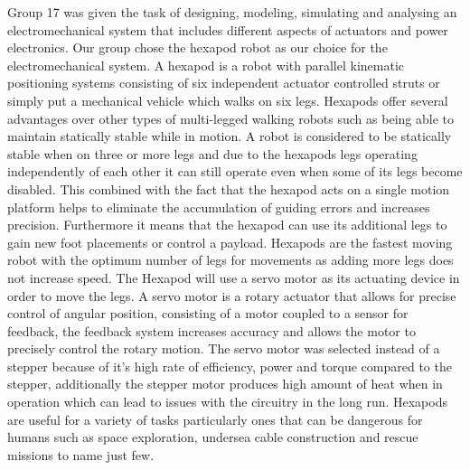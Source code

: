 
Group 17 was given the task of designing, modeling, simulating and analysing an electromechanical system that includes different aspects of actuators and power electronics. Our group chose the hexapod robot as our choice for the electromechanical system. A hexapod is a robot with parallel kinematic positioning systems consisting of six independent actuator controlled struts or simply put a mechanical vehicle which walks on six legs. Hexapods offer several advantages over other types of multi-legged  walking robots such as being able to maintain statically stable while in motion. A robot is considered to be statically stable when on three or more legs and due to the hexapods legs operating independently of each other it can still operate even when some of its legs become disabled. This combined with the fact that the hexapod acts on a single motion platform helps to eliminate the accumulation of guiding errors and increases precision. Furthermore it means that  the hexapod can use its additional legs to gain new foot placements or control a payload. Hexapods are the fastest moving robot with the optimum number of legs for movements as adding more legs does not increase speed. The Hexapod will use a servo motor as its actuating device in order to move the legs. A servo motor is a rotary actuator that allows for precise control of angular position, consisting of a motor coupled to a sensor for feedback, the feedback system increases accuracy and allows the motor to precisely control the rotary motion. The servo motor was selected instead of a stepper because of it's high rate of efficiency, power and torque compared to the stepper, additionally the stepper motor produces  high amount of heat when in operation which can lead to issues with the circuitry in the long run. Hexapods are useful for a variety of tasks particularly ones that can be dangerous for humans such as space exploration, undersea cable construction and rescue missions to name just few. 









